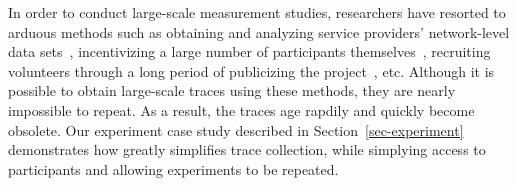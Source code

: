 In order to conduct large-scale measurement studies, researchers have
resorted to arduous methods such as obtaining and analyzing service
providers' network-level data sets~\cite{xu:imc:2011, trestian:imc:2009,
trestian:ton:2012}, incentivizing a large number of participants
themselves~\cite{falaki:mobisys:2010}, recruiting volunteers through a long
period of publicizing the project~\cite{shye:micro:2009}, etc. Although it is
possible to obtain large-scale traces using these methods, they are nearly
impossible to repeat. As a result, the traces age rapdily and quickly become
obsolete. Our experiment case study described in Section~\ref{sec-experiment}
demonstrates how \PhoneLab{} greatly simplifies trace collection, while
simplying access to participants and allowing experiments to be repeated.
